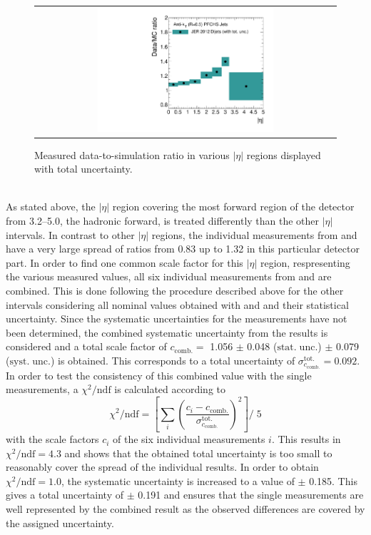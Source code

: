\begin{figure}[!p]
  \centering
  \begin{tabular}{c}
                \includegraphics[width=0.6\textwidth]{figures/JER_2012_final_combination_v1.pdf}
  \end{tabular}
  \caption{Measured data-to-simulation ratio in various $|\eta|$ regions displayed with total uncertainty.}
  \label{fig:result_2012}
\end{figure}
\\
As stated above, the $|\eta|$ region covering the most forward region of the detector from 3.2--5.0, \ie the hadronic forward, is treated differently than the other $|\eta|$ intervals. In contrast to other $|\eta|$ regions, the individual measurements from \pythia and \herwig have a very large spread of ratios from 0.83 up to 1.32 in this particular detector part. In order to find one common scale factor for this $|\eta|$ region, respresenting the various measured values, all six individual measurements from \pythia and \herwig are combined. This is done following the procedure described above for the other intervals considering all nominal values obtained with \pythia and \herwig and their statistical uncertainty. Since the systematic uncertainties for the \herwig measurements have not been determined, the combined systematic uncertainty from the \pythia results is considered and a total scale factor of $c_\mathrm{comb.} =$ 1.056 $\pm$ 0.048 ($\mathrm{stat.\; unc.}$) $\pm$ 0.079 ($\mathrm{syst. \; unc.}$) is obtained. This corresponds to a total uncertainty of $\sigma^\mathrm{tot.}_{c_\mathrm{comb.}} = 0.092$. In order to test the consistency of this combined value with the single measurements, a $\chi^2/\mathrm{ndf}$ is calculated according to
\begin{equation}
\chi^2/\mathrm{ndf} = \left[\sum_i \left ( \frac{c_i-c_\mathrm{comb.}}{\sigma^\mathrm{tot.}_{c_\mathrm{comb.}}} \right)^2 \right] /\; 5 
\end{equation}
with the scale factors $c_i$ of the six individual measurements $i$. This results in $\chi^2/\mathrm{ndf} = 4.3$ and shows that the obtained total uncertainty is too small to reasonably cover the spread of the individual results. In order to obtain $\chi^2/\mathrm{ndf} = 1.0$, the systematic uncertainty is increased to a value of $\pm$ 0.185. This gives a total uncertainty of $\pm$ 0.191 and ensures that the single measurements are well represented by the combined result as the observed differences are covered by the assigned uncertainty.\\
